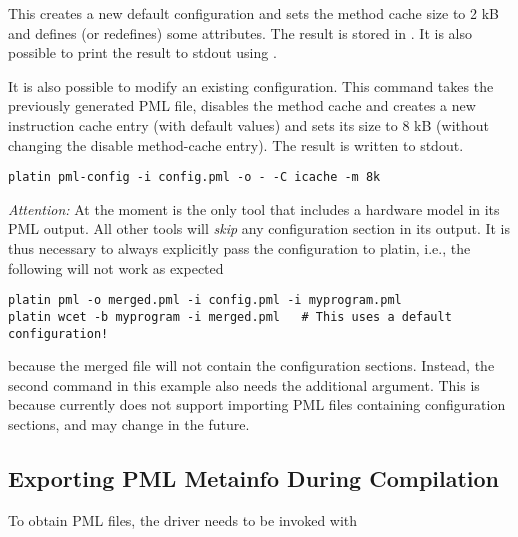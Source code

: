 This creates a new default configuration and sets the method cache size to 2 kB and defines (or redefines) some
attributes. The result is stored in . It is also possible to print the result to stdout using 
.

It is also possible to modify an existing configuration. This command takes the previously generated PML file,
disables the method cache and creates a new instruction cache entry (with default values) and sets its size to 8 kB
(without changing the disable method-cache entry). The result is written to stdout.

\begin{verbatim}
platin pml-config -i config.pml -o - -C icache -m 8k
\end{verbatim}

\emph{Attention:} At the moment  is the only tool that includes a hardware model in its PML output.
All other tools will \emph{skip} any configuration section in its output. It is thus necessary to always explicitly pass
the configuration to platin, i.e., the following will not work as expected

\begin{verbatim}
platin pml -o merged.pml -i config.pml -i myprogram.pml
platin wcet -b myprogram -i merged.pml   # This uses a default configuration!
\end{verbatim}

because the merged file will not contain the configuration sections. Instead, the second command in this example also
needs the additional  argument. This is because  currently does
not support importing PML files containing configuration sections, and may change in the future.


\subsection{Exporting PML Metainfo During Compilation}

To obtain PML files, the  driver needs to be invoked with

